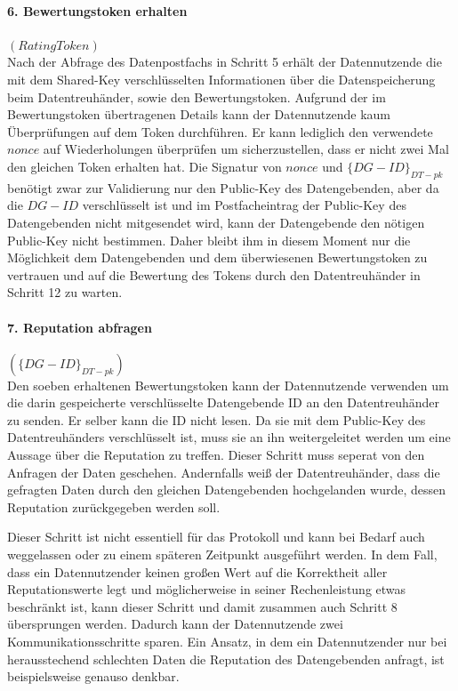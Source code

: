 \documentclass[
	fontsize=12pt,
	headings=small,
	parskip=half,           %
	bibliography=totoc,
	numbers=noenddot,       %
	open=any,               %
]{scrreprt}
\begin{document}
\paragraph{6. Bewertungstoken erhalten}$(RatingToken)$\\
Nach der Abfrage des Datenpostfachs in Schritt 5 erhält der Datennutzende die mit dem Shared-Key verschlüsselten Informationen über die Datenspeicherung beim Datentreuhänder, sowie den Bewertungstoken. Aufgrund der im Bewertungstoken übertragenen Details kann der Datennutzende kaum Überprüfungen auf dem Token durchführen. Er kann lediglich den verwendete $nonce$ auf Wiederholungen überprüfen um sicherzustellen, dass er nicht zwei Mal den gleichen Token erhalten hat. Die Signatur von $nonce$ und ${\{DG-ID\}}_{DT-pk}$ benötigt zwar zur Validierung nur den Public-Key des Datengebenden, aber da die $DG-ID$ verschlüsselt ist und im Postfacheintrag der Public-Key des Datengebenden nicht mitgesendet wird, kann der Datengebende den nötigen Public-Key nicht bestimmen. Daher bleibt ihm in diesem Moment nur die Möglichkeit dem Datengebenden und dem überwiesenen Bewertungstoken zu vertrauen und auf die Bewertung des Tokens durch den Datentreuhänder in Schritt 12 zu warten.

\paragraph{7. Reputation abfragen}$({\{DG-ID\}}_{DT-pk})$\\
Den soeben erhaltenen Bewertungstoken kann der Datennutzende verwenden um die darin gespeicherte verschlüsselte Datengebende ID an den Datentreuhänder zu senden. Er selber kann die ID nicht lesen. Da sie mit dem Public-Key des Datentreuhänders verschlüsselt ist, muss sie an ihn weitergeleitet werden um eine Aussage über die Reputation zu treffen. Dieser Schritt muss seperat von den Anfragen der Daten geschehen. Andernfalls weiß der Datentreuhänder, dass die gefragten Daten durch den gleichen Datengebenden hochgelanden wurde, dessen Reputation zurückgegeben werden soll.

Dieser Schritt ist nicht essentiell für das Protokoll und kann bei Bedarf auch weggelassen oder zu einem späteren Zeitpunkt ausgeführt werden. In dem Fall, dass ein Datennutzender keinen großen Wert auf die Korrektheit aller Reputationswerte legt und möglicherweise in seiner Rechenleistung etwas beschränkt ist, kann dieser Schritt und damit zusammen auch Schritt 8 übersprungen werden. Dadurch kann der Datennutzende zwei Kommunikationsschritte sparen. Ein Ansatz, in dem ein Datennutzender nur bei herausstechend schlechten Daten die Reputation des Datengebenden anfragt, ist beispielsweise genauso denkbar.
\end{document}
